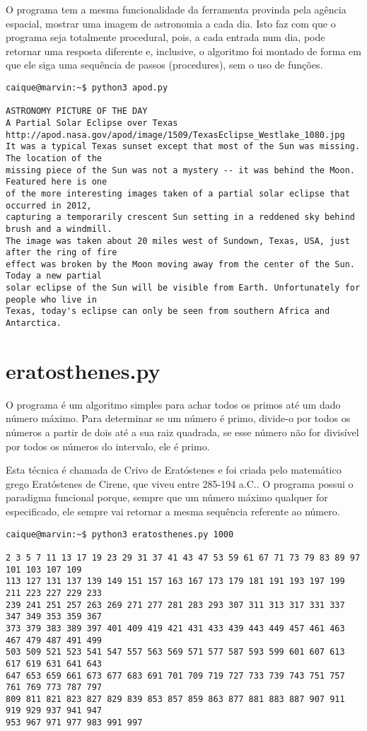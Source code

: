 \documentclass{article}
\begin{document}
\sloppy
O programa tem a mesma funcionalidade da ferramenta provinda pela agência
espacial, mostrar uma imagem de astronomia a cada dia. Isto faz com que o
programa seja totalmente procedural, pois, a cada entrada num dia, pode
retornar uma resposta diferente e, inclusive, o algoritmo foi montado de forma
em que ele siga uma sequência de passos (procedures), sem o uso de funções.

\begin{verbatim}
caique@marvin:~$ python3 apod.py 

ASTRONOMY PICTURE OF THE DAY
A Partial Solar Eclipse over Texas
http://apod.nasa.gov/apod/image/1509/TexasEclipse_Westlake_1080.jpg
It was a typical Texas sunset except that most of the Sun was missing. The location of the
missing piece of the Sun was not a mystery -- it was behind the Moon. Featured here is one 
of the more interesting images taken of a partial solar eclipse that occurred in 2012, 
capturing a temporarily crescent Sun setting in a reddened sky behind brush and a windmill.
The image was taken about 20 miles west of Sundown, Texas, USA, just after the ring of fire 
effect was broken by the Moon moving away from the center of the Sun. Today a new partial 
solar eclipse of the Sun will be visible from Earth. Unfortunately for people who live in
Texas, today's eclipse can only be seen from southern Africa and Antarctica.
\end{verbatim}

\section*{eratosthenes.py}
O programa é um algoritmo simples para achar todos os primos até um dado número
máximo. Para determinar se um número é primo, divide-o por todos os números a
partir de dois até a sua raiz quadrada, se esse número não for divisível por
todos os números do intervalo, ele é primo.

Esta técnica é chamada de Crivo de Eratóstenes e foi criada pelo matemático
grego Eratóstenes de Cirene, que viveu entre 285-194 a.C.. O programa possui o
paradigma funcional porque, sempre que um número máximo qualquer for
especificado, ele sempre vai retornar a mesma sequência referente ao número.
\sloppy
\begin{verbatim}caique@marvin:~$ python3 eratosthenes.py 1000

2 3 5 7 11 13 17 19 23 29 31 37 41 43 47 53 59 61 67 71 73 79 83 89 97 101 103 107 109 
113 127 131 137 139 149 151 157 163 167 173 179 181 191 193 197 199 211 223 227 229 233 
239 241 251 257 263 269 271 277 281 283 293 307 311 313 317 331 337 347 349 353 359 367 
373 379 383 389 397 401 409 419 421 431 433 439 443 449 457 461 463 467 479 487 491 499
503 509 521 523 541 547 557 563 569 571 577 587 593 599 601 607 613 617 619 631 641 643
647 653 659 661 673 677 683 691 701 709 719 727 733 739 743 751 757 761 769 773 787 797
809 811 821 823 827 829 839 853 857 859 863 877 881 883 887 907 911 919 929 937 941 947 
953 967 971 977 983 991 997
\end{verbatim}
\end{document}
